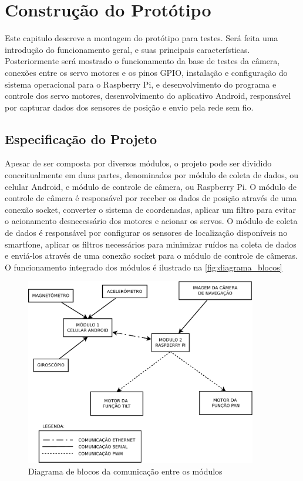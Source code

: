
\chapter{Construção do Protótipo}
\label{chap:prototipo}

Este capitulo descreve a montagem do protótipo para testes. Será feita uma introdução do funcionamento geral, e suas principais características. Posteriormente será mostrado o funcionamento da base de testes da câmera, conexões entre os servo motores e os pinos GPIO, instalação e configuração do sistema operacional para o Raspberry Pi, e desenvolvimento do programa e controle dos servo motores, desenvolvimento do aplicativo Android, responsável por capturar dados dos sensores de posição e envio pela rede sem fio.

\section{Especificação do Projeto}
\label{sec:especificacao}

Apesar de ser composta por diversos módulos, o projeto pode ser dividido conceitualmente em duas partes, denominados por módulo de coleta de dados, ou celular Android, e módulo de controle de câmera, ou Raspberry Pi. O módulo de controle de câmera é responsável por receber os dados de posição através de uma conexão socket, converter o sistema de coordenadas, aplicar um filtro para evitar o acionamento desnecessário dos motores e acionar os servos. O módulo de coleta de dados é responsável por configurar os sensores de localização disponíveis no smartfone, aplicar os filtros necessários para minimizar ruídos na coleta de dados e enviá-los através de uma conexão socket para o módulo de controle de câmeras. O funcionamento integrado dos módulos é ilustrado na \autoref{fig:diagrama_blocos} \par

\begin{figure}[H]
	\centering
	\includegraphics[width=0.9\textwidth]{figuras/diagrama-modulos-eps-converted-to.pdf}
	\caption{Diagrama de blocos da comunicação entre os módulos}
	\label{fig:diagrama_blocos}
\end{figure}